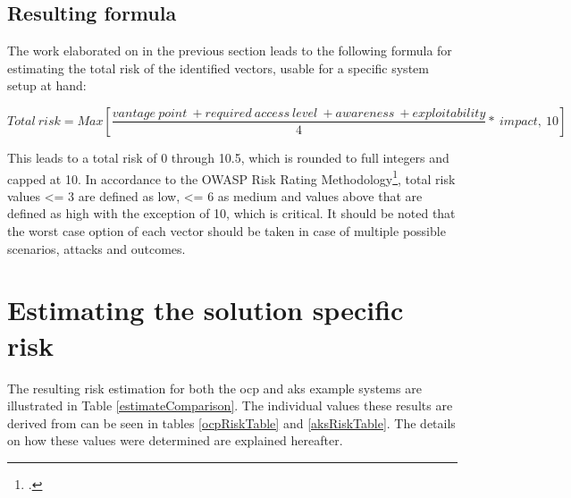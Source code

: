 \subsection{Resulting formula}

The work elaborated on in the previous section leads to the following formula for estimating the total risk of the identified vectors, usable for a specific system setup at hand:

$${Total\ risk}= Max[\frac{ {vantage\ point}\ + {required\ access\ level}\ + {awareness}\ + {exploitability} }{4}*\ impact,\ 10]$$

This leads to a total risk of 0 through 10.5, which is rounded to full integers and capped at 10. In accordance to the OWASP Risk Rating Methodology\footcite[][, section 'Step 4: Determining the Severity of the Risk']{riskRating}, total risk values <= 3 are defined as low, <= 6 as medium and values above that are defined as high with the exception of 10, which is critical.
It should be noted that the worst case option of each vector should be taken in case of multiple possible scenarios, attacks and outcomes.

\section{Estimating the solution specific risk} \label{riskEstimate}

The resulting risk estimation for both the \gls{ocp} and \gls{aks} example systems are illustrated in Table \ref{estimateComparison}. The individual values these results are derived from can be seen in tables \ref{ocpRiskTable} and \ref{aksRiskTable}. The details on how these values were determined are explained hereafter.

